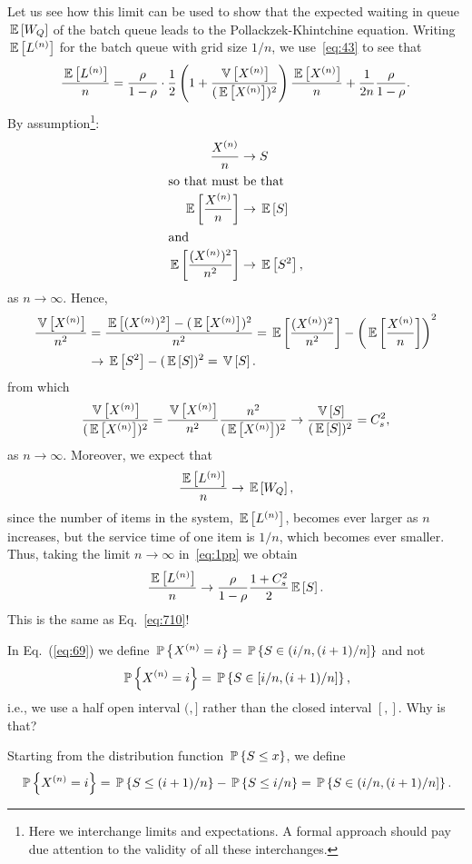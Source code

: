Let us see how this limit can be used to show that the expected
waiting in queue $\E{W_Q}$ of the batch queue leads to the
Pollackzek-Khintchine equation.  Writing $\E{L^{(n)}}$ for the batch
queue with grid size $1/n$, we use~\eqref{eq:43} to see that
\begin{align}\label{eq:1pp}
\frac{\E{L^{(n)}}}{n}
= \frac{\rho}{1-\rho}\cdot \frac12\left(1 + \frac{\V{X^{(n)}}}{(\E{X^{(n)}})^2}\right) \frac{\E{X^{(n)}}}n +  \frac1{2n}\frac{\rho}{1-\rho}.
\end{align}
By assumption\footnote{ Here we interchange limits and expectations. A
  formal approach should pay due attention to the validity of all
  these interchanges.}:
\begin{align*}
\frac{X^{(n)}}n &\to S \\
\intertext{so that must be that
}
\E{\frac{X^{(n)}}n} &\to \E S \\
\intertext{and}
\E{\frac{(X^{(n)})^2}{n^2}} &\to \E{S^2},
\end{align*}
as $n\to \infty$.  
Hence, 
\begin{equation*}
  \begin{split}
\frac{\V{X^{(n)}}}{n^2} 
&=  
\frac{\E{(X^{(n)})^2} - (\E{X^{(n)}})^2}{n^2} = 
\E{\frac{(X^{(n)})^2}{n^2}} - \left(\E{\frac{X^{(n)}}{n}}\right)^2 \\
&\to \E{S^2} - (\E{S})^2  =  \V{S}.
  \end{split}
\end{equation*}
from which
\begin{equation*}
\frac{\V{X^{(n)}}} {(\E{X^{(n)}})^2} = \frac{\V{X^{(n)}}}{n^2}\frac{n^2}{(\E{X^{(n)}})^2} \to 
\frac{\V S}{(\E S)^2} = C_s^2,
\end{equation*}
as $n\to \infty$.  Moreover, we expect that
\begin{equation*}
\frac{\E{L^{(n)}}}n \to \E{W_Q},
\end{equation*}
since the number of items in the system, $\E{L^{(n)}}$, becomes ever
larger as $n$ increases, but the service time of one item is $1/n$,
which becomes ever smaller. Thus, taking the limit $n\to\infty$
in~\eqref{eq:1pp} we obtain
\begin{equation*}
  \frac{\E{L^{(n)}}}{n}
  \to \frac{\rho}{1-\rho}  \frac{1 + C_s^2}2\E{S}.
\end{equation*}
This is the same as Eq.~\eqref{eq:710}!

\begin{question}
In Eq.~(\ref{eq:69}) we  define $\P{X^{(n)} = i} = \P{ S\in(i/n, (i+1)/n]}$ and not 
\begin{equation*}
\P{X^{(n)} = i} = \P{S\in[i/n, (i+1)/n]},  
\end{equation*}
i.e., we use a half open interval $(,]$ rather than the closed
interval $[,]$. Why is that?
\begin{solution}
  Starting from the distribution function $\P{S\leq x}$, we define
  \begin{equation*}
  \P{X^{(n)} = i} = \P{ S\leq (i+1)/n} - \P{S\leq i/n} = \P{
  S\in(i/n, (i+1)/n]}.
     \end{equation*}
\end{solution}
\end{question}

